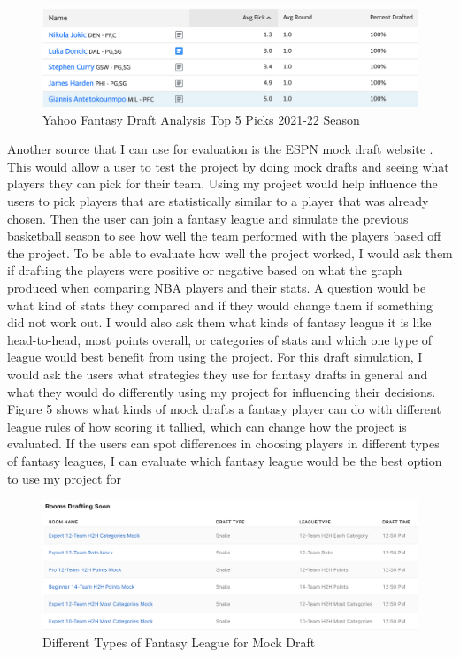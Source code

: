\documentclass[10pt,twocolumn]{article}
\begin{document}
\begin{figure}
    \centering
    \includegraphics[width=.98\linewidth]{top5.png}
    \caption{
        Yahoo Fantasy Draft Analysis Top 5 Picks 2021-22 Season
    }
    \label{fig:second-page-4}
\end{figure}

Another source that I can use for evaluation is the ESPN mock draft website \cite{fantasyDraft}. This would allow a user to test the project by doing mock drafts and seeing what players they can pick for their team. Using my project would help influence the users to pick players that are statistically similar to a player that was already chosen. Then the user can join a fantasy league and simulate the previous basketball season to see how well the team performed with the players based off the project. To be able to evaluate how well the project worked, I would ask them if drafting the players were positive or negative based on what the graph produced when comparing NBA players and their stats. A question would be what kind of stats they compared and if they would change them if something did not work out. I would also ask them what kinds of fantasy league it is like head-to-head, most points overall, or categories of stats and which one type of league would best benefit from using the project. For this draft simulation, I would ask the users what strategies they use for fantasy drafts in general and what they would do differently using my project for influencing their decisions. Figure 5 shows what kinds of mock drafts a fantasy player can do with different league rules of how scoring it tallied, which can change how the project is evaluated. If the users can spot differences in choosing players in different types of fantasy leagues, I can evaluate which fantasy league would be the best option to use my project for

\begin{figure}
    \centering
    \includegraphics[width=.98\linewidth]{mockdraft.png}
    \caption{
        Different Types of Fantasy League for Mock Draft
    }
    \label{fig:second-page-5}
\end{figure}
\end{document}
